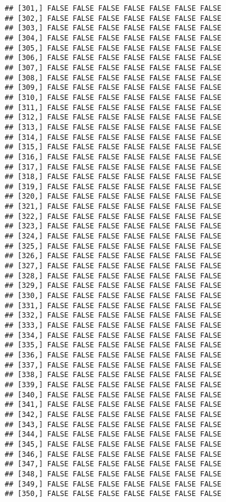 \documentclass[
]{article}
\begin{document}
\begin{verbatim}
## [301,] FALSE FALSE FALSE FALSE FALSE FALSE FALSE
## [302,] FALSE FALSE FALSE FALSE FALSE FALSE FALSE
## [303,] FALSE FALSE FALSE FALSE FALSE FALSE FALSE
## [304,] FALSE FALSE FALSE FALSE FALSE FALSE FALSE
## [305,] FALSE FALSE FALSE FALSE FALSE FALSE FALSE
## [306,] FALSE FALSE FALSE FALSE FALSE FALSE FALSE
## [307,] FALSE FALSE FALSE FALSE FALSE FALSE FALSE
## [308,] FALSE FALSE FALSE FALSE FALSE FALSE FALSE
## [309,] FALSE FALSE FALSE FALSE FALSE FALSE FALSE
## [310,] FALSE FALSE FALSE FALSE FALSE FALSE FALSE
## [311,] FALSE FALSE FALSE FALSE FALSE FALSE FALSE
## [312,] FALSE FALSE FALSE FALSE FALSE FALSE FALSE
## [313,] FALSE FALSE FALSE FALSE FALSE FALSE FALSE
## [314,] FALSE FALSE FALSE FALSE FALSE FALSE FALSE
## [315,] FALSE FALSE FALSE FALSE FALSE FALSE FALSE
## [316,] FALSE FALSE FALSE FALSE FALSE FALSE FALSE
## [317,] FALSE FALSE FALSE FALSE FALSE FALSE FALSE
## [318,] FALSE FALSE FALSE FALSE FALSE FALSE FALSE
## [319,] FALSE FALSE FALSE FALSE FALSE FALSE FALSE
## [320,] FALSE FALSE FALSE FALSE FALSE FALSE FALSE
## [321,] FALSE FALSE FALSE FALSE FALSE FALSE FALSE
## [322,] FALSE FALSE FALSE FALSE FALSE FALSE FALSE
## [323,] FALSE FALSE FALSE FALSE FALSE FALSE FALSE
## [324,] FALSE FALSE FALSE FALSE FALSE FALSE FALSE
## [325,] FALSE FALSE FALSE FALSE FALSE FALSE FALSE
## [326,] FALSE FALSE FALSE FALSE FALSE FALSE FALSE
## [327,] FALSE FALSE FALSE FALSE FALSE FALSE FALSE
## [328,] FALSE FALSE FALSE FALSE FALSE FALSE FALSE
## [329,] FALSE FALSE FALSE FALSE FALSE FALSE FALSE
## [330,] FALSE FALSE FALSE FALSE FALSE FALSE FALSE
## [331,] FALSE FALSE FALSE FALSE FALSE FALSE FALSE
## [332,] FALSE FALSE FALSE FALSE FALSE FALSE FALSE
## [333,] FALSE FALSE FALSE FALSE FALSE FALSE FALSE
## [334,] FALSE FALSE FALSE FALSE FALSE FALSE FALSE
## [335,] FALSE FALSE FALSE FALSE FALSE FALSE FALSE
## [336,] FALSE FALSE FALSE FALSE FALSE FALSE FALSE
## [337,] FALSE FALSE FALSE FALSE FALSE FALSE FALSE
## [338,] FALSE FALSE FALSE FALSE FALSE FALSE FALSE
## [339,] FALSE FALSE FALSE FALSE FALSE FALSE FALSE
## [340,] FALSE FALSE FALSE FALSE FALSE FALSE FALSE
## [341,] FALSE FALSE FALSE FALSE FALSE FALSE FALSE
## [342,] FALSE FALSE FALSE FALSE FALSE FALSE FALSE
## [343,] FALSE FALSE FALSE FALSE FALSE FALSE FALSE
## [344,] FALSE FALSE FALSE FALSE FALSE FALSE FALSE
## [345,] FALSE FALSE FALSE FALSE FALSE FALSE FALSE
## [346,] FALSE FALSE FALSE FALSE FALSE FALSE FALSE
## [347,] FALSE FALSE FALSE FALSE FALSE FALSE FALSE
## [348,] FALSE FALSE FALSE FALSE FALSE FALSE FALSE
## [349,] FALSE FALSE FALSE FALSE FALSE FALSE FALSE
## [350,] FALSE FALSE FALSE FALSE FALSE FALSE FALSE

\end{verbatim}
\end{document}
